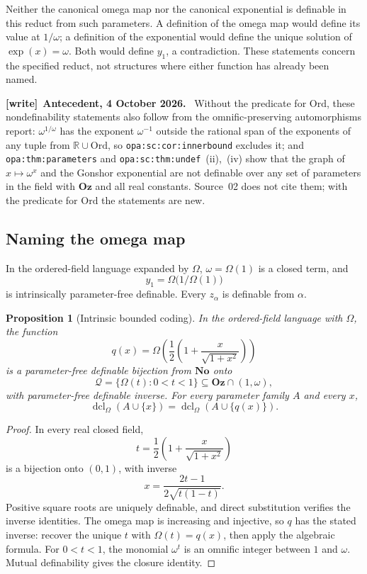 \documentclass[11pt,a4paper]{article}
\numberwithin{equation}{section}
\newtheorem{proposition}[proposition]{Proposition}
\theoremstyle{definition}
\theoremstyle{remark}
\newcommand{\No}{\mathbf{No}}
\newcommand{\Oz}{\mathbf{Oz}}
\newcommand{\Ord}{\mathrm{Ord}}
\newcommand{\R}{\mathbb R}
\newcommand{\lbl}[1]{\nolinkurl{#1}}
\newenvironment{writenote}[1][]{\par\medskip\begingroup\small\noindent\textbf{[write]}\if\relax\detokenize{#1}\relax\else~\textbf{#1.}\fi~\ignorespaces}{\par\endgroup\medskip}
\newcommand{\Qrange}{\mathcal Q}
\begin{document}
Neither the canonical omega map nor the canonical exponential is
definable in this reduct from such parameters. A definition of the
omega map would define its value at \(1/\omega\); a definition of
the exponential would define the unique solution of
\(\exp(x)=\omega\). Both would define \(y_1\), a contradiction.
These statements concern the specified reduct, not structures where
either function has already been named.
\begin{writenote}[Antecedent, 4 October 2026]
Without the predicate for $\Ord$, these nondefinability statements also follow
from the omnific-preserving automorphisms report: $\omega^{1/\omega}$ has the
exponent $\omega^{-1}$ outside the rational span of the exponents of any tuple
from $\R\cup\Ord$, so \lbl{opa:sc:cor:innerbound} excludes it; and
\lbl{opa:thm:parameters} and \lbl{opa:sc:thm:undef}~(ii),~(iv) show that the
graph of $x\mapsto\omega^x$ and the Gonshor exponential are not definable over
any set of parameters in the field with $\Oz$ and all real constants.
Source~02 does not cite them; with the predicate for $\Ord$ the statements are
new.
\end{writenote}


\subsection{Naming the omega map}

In the ordered-field language expanded by \(\Omega\),
\(\omega=\Omega(1)\) is a closed term, and
\[
 y_1=\Omega\bigl(1/\Omega(1)\bigr)
\]
is intrinsically parameter-free definable. Every \(z_\alpha\) is
definable from \(\alpha\).

\begin{proposition}[Intrinsic bounded coding]\label{dsn:rp:prop:omega-code}
In the ordered-field language with \(\Omega\), the function
\[
 q(x)=\Omega\left(
    \frac12\left(1+\frac{x}{\sqrt{1+x^2}}\right)\right)
\]
is a parameter-free definable bijection from \(\No\) onto
\[
 \Qrange=\{\Omega(t):0<t<1\}\subseteq\Oz\cap(1,\omega),
\]
with parameter-free definable inverse. For every parameter family
\(A\) and every \(x\),
\[
 \operatorname{dcl}_{\Omega}(A\cup\{x\})
   =\operatorname{dcl}_{\Omega}(A\cup\{q(x)\}).
\]
\end{proposition}

\begin{proof}
In every real closed field,
\[
 t=\frac12\left(1+\frac{x}{\sqrt{1+x^2}}\right)
\]
is a bijection onto \((0,1)\), with inverse
\[
 x=\frac{2t-1}{2\sqrt{t(1-t)}}.
\]
Positive square roots are uniquely definable, and direct substitution
verifies the inverse identities. The omega map is increasing and
injective, so \(q\) has the stated inverse: recover the unique \(t\)
with \(\Omega(t)=q(x)\), then apply the algebraic formula.
For \(0<t<1\), the monomial \(\omega^t\) is an omnific integer
between \(1\) and \(\omega\). Mutual definability gives the closure
identity.
\end{proof}
\end{document}
